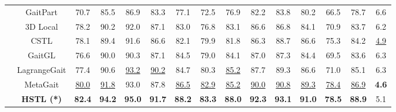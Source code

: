 \begin{table}[h]
{\begin{tabular}{c|c|ccccccccccc|c|c}
                                                       & GaitPart \cite{fan2020gaitpart}               & 70.7                     & 85.5                    & 86.9             & 83.3             & 77.1             & 72.5             & 76.9             & 82.2             & 83.8             & 80.2             & 66.5             & 78.7             & 6.6             \\
                                                       & 3D Local \cite{huang20213d}                   & 78.2                     & 90.2                    & 92.0             & 87.1             & 83.0             & 76.8             & 83.1             & 86.6             & 86.8             & 84.1             & 70.9             & 83.7             & 6.2             \\
                                                       & CSTL \cite{huang2021context}                  & 78.1                     & 89.4                    & 91.6             & 86.6             & 82.1             & 79.9             & 81.8             & 86.3             & 88.7             & 86.6             & 75.3             & 84.2             & \underline{4.9} \\
                                                       & GaitGL \cite{lin2021gait}                     & 76.6                     & 90.0                    & 90.3             & 87.1             & 84.5             & 79.0             & 84.1             & 87.0             & 87.3             & 84.4             & 69.5             & 83.6             & 6.3             \\
                                                       & LagrangeGait \cite{chai2022lagrange}          & 77.4                     & 90.6                    & \underline{93.2} & \underline{90.2} & 84.7             & 80.3             & \underline{85.2} & 87.7             & 89.3             & 86.6             & 71.0             & 85.1             & 6.3             \\
                                                       & MetaGait \cite{dou2022metagait}               & \underline{80.0}         & \underline{91.8}        & 93.0             & 87.8             & \underline{86.5} & \underline{82.9} & \underline{85.2} & \underline{90.0} & \underline{90.8} & \underline{89.3} & \underline{78.4} & \underline{86.9} & \textbf{4.6}    \\
            \cline{2-15}                               & \textbf{HSTL (*)}                             & \textbf{82.4}            & \textbf{94.2}           & \textbf{95.0}    & \textbf{91.7}    & \textbf{88.2}    & \textbf{83.3}    & \textbf{88.0}    & \textbf{92.3}    & \textbf{93.1}    & \textbf{91.0}    & \textbf{78.5}    & \textbf{88.9}    & 5.1             \\

\end{tabular}}
\end{table}
